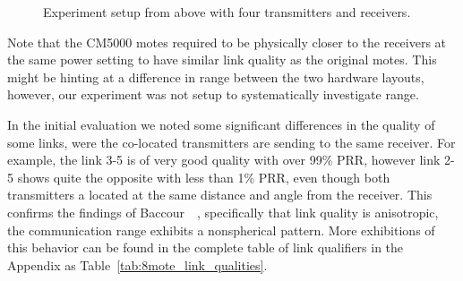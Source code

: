 \begin{figure}[H]
	\centering
	\caption{Experiment setup from above with four transmitters and receivers.}
	\label{fig:8_mote_setup}
\end{figure}

Note that the CM5000 motes required to be physically closer to the receivers at the same power setting to have similar link quality as the original motes.
This might be hinting at a difference in range between the two hardware layouts, however, our experiment was not setup to systematically investigate range.

In the initial evaluation we noted some significant differences in the quality of some links, were the co-located transmitters are sending to the same receiver.
For example, the link 3-5 is of very good quality with over 99\% PRR, however link 2-5 shows quite the opposite with less than 1\% PRR, even though both transmitters a located at the same distance and angle from the receiver.
This confirms the findings of Baccour~\etal~\cite{Baccour2012}, specifically that link quality is anisotropic, \ie the communication range exhibits a nonspherical pattern.
More exhibitions of this behavior can be found in the complete table of link qualifiers in the Appendix as Table~\ref{tab:8mote_link_qualities}.

